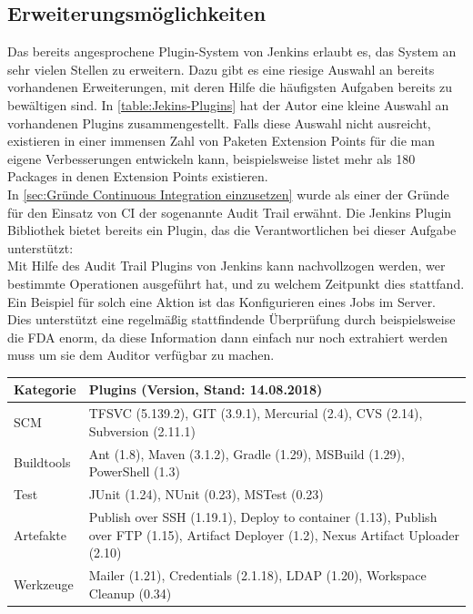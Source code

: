 \subsection*{Erweiterungsmöglichkeiten}
Das bereits angesprochene Plugin-System von Jenkins erlaubt es, das System an sehr vielen Stellen zu erweitern. Dazu gibt es eine riesige Auswahl an bereits vorhandenen Erweiterungen, mit deren Hilfe die häufigsten Aufgaben bereits zu bewältigen sind. In \autoref{table:Jekins-Plugins} hat der Autor eine kleine Auswahl an vorhandenen Plugins zusammengestellt. Falls diese Auswahl nicht ausreicht, existieren in einer immensen Zahl von Paketen Extension Points für die man eigene Verbesserungen entwickeln kann, beispielsweise \cite{jenkins-extensionpoints} listet mehr als 180 Packages in denen Extension Points existieren.\\
In \autoref{sec:Gründe Continuous Integration einzusetzen} wurde als einer der Gründe für den Einsatz von CI der sogenannte Audit Trail erwähnt. Die Jenkins Plugin Bibliothek bietet bereits ein Plugin, das die Verantwortlichen bei dieser Aufgabe unterstützt:\\
Mit Hilfe des Audit Trail Plugins von Jenkins kann nachvollzogen werden, wer bestimmte Operationen ausgeführt hat, und zu welchem Zeitpunkt dies stattfand. Ein Beispiel für solch eine Aktion ist das Konfigurieren eines Jobs im Server. \cite{jenkins-audit-trail}\\
Dies unterstützt eine regelmäßig stattfindende Überprüfung durch beispielsweise die FDA enorm, da diese Information dann einfach nur noch extrahiert werden muss um sie dem Auditor verfügbar zu machen.
\begin{center}
  \begin{tabularx}{\textwidth}{lX}
    \toprule
    Kategorie & Plugins (Version, Stand: 14.08.2018) \\
    \midrule
    SCM &  TFSVC (5.139.2), GIT (3.9.1), Mercurial (2.4), CVS (2.14), Subversion (2.11.1) \\
		\addlinespace
    Buildtools & Ant (1.8), Maven (3.1.2), Gradle (1.29), MSBuild (1.29), PowerShell (1.3)\\
		\addlinespace
		Test & JUnit (1.24), NUnit (0.23), MSTest (0.23) \\
		\addlinespace
		Artefakte & Publish over SSH (1.19.1), Deploy to container (1.13), Publish over FTP (1.15), Artifact Deployer (1.2), Nexus Artifact Uploader (2.10)\\
		\addlinespace
		Werkzeuge & Mailer (1.21), Credentials (2.1.18), LDAP (1.20), Workspace Cleanup (0.34)\\
    \bottomrule
  \end{tabularx}
	\label{table:Jekins-Plugins}
\end{center}
